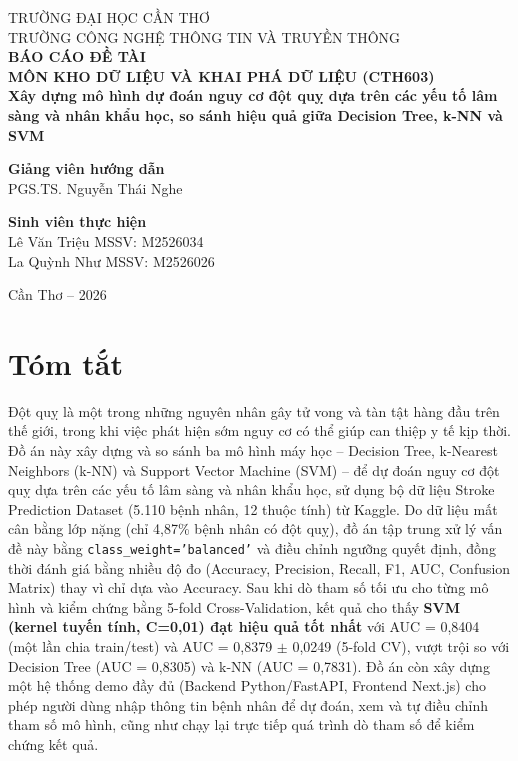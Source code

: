 \documentclass[12pt,a4paper]{report}
\newcommand{\tendetai}{Xây dựng mô hình dự đoán nguy cơ đột quỵ dựa trên các yếu tố lâm sàng và nhân khẩu học, so sánh hiệu quả giữa Decision Tree, k-NN và SVM}
\newcommand{\giangvien}{PGS.TS. Nguyễn Thái Nghe}
\newcommand{\sinhvienmot}{Lê Văn Triệu \hfill MSSV: M2526034}
\newcommand{\sinhvienhai}{La Quỳnh Như \hfill MSSV: M2526026}
\begin{document}
\begin{titlepage}
\centering
\large
TRƯỜNG ĐẠI HỌC CẦN THƠ\\
TRƯỜNG CÔNG NGHỆ THÔNG TIN VÀ TRUYỀN THÔNG\\[2cm]

{\Large\bfseries BÁO CÁO ĐỀ TÀI}\\[0.5cm]
{\Large\bfseries MÔN KHO DỮ LIỆU VÀ KHAI PHÁ DỮ LIỆU (CTH603)}\\[1.5cm]

{\LARGE\bfseries \tendetai}\\[3cm]

\begin{minipage}{0.48\textwidth}
\centering
\textbf{Giảng viên hướng dẫn}\\[0.3cm]
\giangvien
\end{minipage}
\hfill
\begin{minipage}{0.48\textwidth}
\centering
\textbf{Sinh viên thực hiện}\\[0.3cm]
\sinhvienmot\\[0.2cm]
\sinhvienhai
\end{minipage}

\vfill
{\large Cần Thơ -- 2026}
\end{titlepage}

\tableofcontents
\clearpage

\chapter*{Tóm tắt}

Đột quỵ là một trong những nguyên nhân gây tử vong và tàn tật hàng đầu trên thế giới, trong khi việc phát hiện sớm nguy cơ có thể giúp can thiệp y tế kịp thời. Đồ án này xây dựng và so sánh ba mô hình máy học -- Decision Tree, k-Nearest Neighbors (k-NN) và Support Vector Machine (SVM) -- để dự đoán nguy cơ đột quỵ dựa trên các yếu tố lâm sàng và nhân khẩu học, sử dụng bộ dữ liệu Stroke Prediction Dataset (5.110 bệnh nhân, 12 thuộc tính) từ Kaggle. Do dữ liệu mất cân bằng lớp nặng (chỉ 4,87\% bệnh nhân có đột quỵ), đồ án tập trung xử lý vấn đề này bằng \texttt{class\_weight='balanced'} và điều chỉnh ngưỡng quyết định, đồng thời đánh giá bằng nhiều độ đo (Accuracy, Precision, Recall, F1, AUC, Confusion Matrix) thay vì chỉ dựa vào Accuracy. Sau khi dò tham số tối ưu cho từng mô hình và kiểm chứng bằng 5-fold Cross-Validation, kết quả cho thấy \textbf{SVM (kernel tuyến tính, C=0,01) đạt hiệu quả tốt nhất} với AUC = 0,8404 (một lần chia train/test) và AUC = 0,8379 $\pm$ 0,0249 (5-fold CV), vượt trội so với Decision Tree (AUC = 0,8305) và k-NN (AUC = 0,7831). Đồ án còn xây dựng một hệ thống demo đầy đủ (Backend Python/FastAPI, Frontend Next.js) cho phép người dùng nhập thông tin bệnh nhân để dự đoán, xem và tự điều chỉnh tham số mô hình, cũng như chạy lại trực tiếp quá trình dò tham số để kiểm chứng kết quả.
\end{document}

